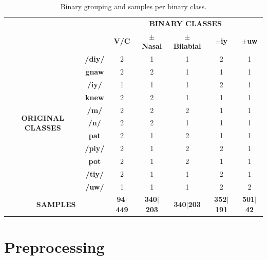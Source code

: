 \begin{table}[h!]
	\centering
	\caption{Binary grouping and samples per binary class.}
	\begin{tabular}{|*{7}{c|}}
		\cline{3-7}
		\multicolumn{2}{c|}{\multirow{2}{*}{}}&\multicolumn{5}{c|}{		\textbf{BINARY CLASSES}}\\\cline{3-7}
		\multicolumn{2}{c|}{}&\textbf{V/C}&\textbf{$\pm$Nasal}&\textbf{$\pm$Bilabial}&\textbf{$\pm$iy}&\textbf{$\pm$uw}\\\hline
		\multirow{11}{*}{\begin{sideways}\textbf{ORIGINAL CLASSES}\end{sideways}}&\textbf{/diy/}&2&1&1&2&1\\\cline{2-7}
		&\textbf{gnaw}&2&2&1&1&1\\\cline{2-7}
		&\textbf{/iy/}&1&1&1&2&1\\\cline{2-7}
		&\textbf{knew}&2&2&1&1&1\\\cline{2-7}
		&\textbf{/m/}&2&2&2&1&1\\\cline{2-7}
		&\textbf{/n/}&2&2&1&1&1\\\cline{2-7}
		&\textbf{pat}&2&1&2&1&1\\\cline{2-7}
		&\textbf{/piy/}&2&1&2&2&1\\\cline{2-7}
		&\textbf{pot}&2&1&2&1&1\\\cline{2-7}
		&\textbf{/tiy/}&2&1&1&2&1\\\cline{2-7}
		&\textbf{/uw/}&1&1&1&2&2\\\hline
		\multicolumn{2}{|c|}{\textbf{SAMPLES}}&\textbf{94$\mid$449}&\textbf{340$\mid$203}&\textbf{340$\mid$203}&\textbf{352$\mid$191}&\textbf{501$\mid$42}\\\hline
	\end{tabular}%
	\label{Table: Binary_Class}
\end{table}%

\section{Preprocessing}

